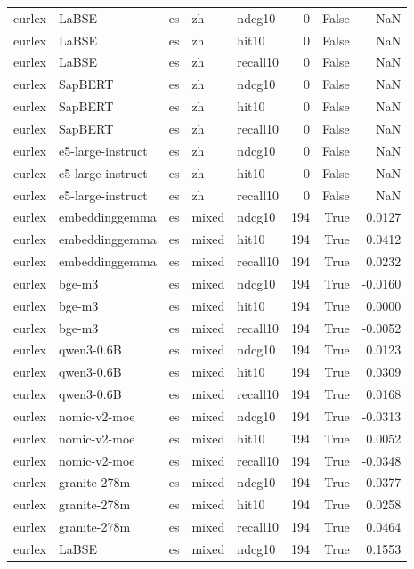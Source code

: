 \begin{tabular}{lllllrrr}
eurlex & LaBSE & es & zh & ndcg10 & 0 & False & NaN \\
eurlex & LaBSE & es & zh & hit10 & 0 & False & NaN \\
eurlex & LaBSE & es & zh & recall10 & 0 & False & NaN \\
eurlex & SapBERT & es & zh & ndcg10 & 0 & False & NaN \\
eurlex & SapBERT & es & zh & hit10 & 0 & False & NaN \\
eurlex & SapBERT & es & zh & recall10 & 0 & False & NaN \\
eurlex & e5-large-instruct & es & zh & ndcg10 & 0 & False & NaN \\
eurlex & e5-large-instruct & es & zh & hit10 & 0 & False & NaN \\
eurlex & e5-large-instruct & es & zh & recall10 & 0 & False & NaN \\
eurlex & embeddinggemma & es & mixed & ndcg10 & 194 & True & 0.0127 \\
eurlex & embeddinggemma & es & mixed & hit10 & 194 & True & 0.0412 \\
eurlex & embeddinggemma & es & mixed & recall10 & 194 & True & 0.0232 \\
eurlex & bge-m3 & es & mixed & ndcg10 & 194 & True & -0.0160 \\
eurlex & bge-m3 & es & mixed & hit10 & 194 & True & 0.0000 \\
eurlex & bge-m3 & es & mixed & recall10 & 194 & True & -0.0052 \\
eurlex & qwen3-0.6B & es & mixed & ndcg10 & 194 & True & 0.0123 \\
eurlex & qwen3-0.6B & es & mixed & hit10 & 194 & True & 0.0309 \\
eurlex & qwen3-0.6B & es & mixed & recall10 & 194 & True & 0.0168 \\
eurlex & nomic-v2-moe & es & mixed & ndcg10 & 194 & True & -0.0313 \\
eurlex & nomic-v2-moe & es & mixed & hit10 & 194 & True & 0.0052 \\
eurlex & nomic-v2-moe & es & mixed & recall10 & 194 & True & -0.0348 \\
eurlex & granite-278m & es & mixed & ndcg10 & 194 & True & 0.0377 \\
eurlex & granite-278m & es & mixed & hit10 & 194 & True & 0.0258 \\
eurlex & granite-278m & es & mixed & recall10 & 194 & True & 0.0464 \\
eurlex & LaBSE & es & mixed & ndcg10 & 194 & True & 0.1553 \\

\end{tabular}
